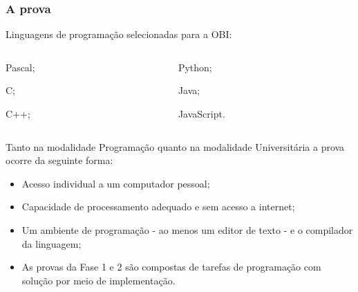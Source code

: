 \begin{frame}
 \frametitle{A prova}
 Linguagens de programação selecionadas para a OBI:
 \begin{itemize}
  \begin{columns}[T]
    \begin{column}[T]{4cm}
      \item Pascal;
      \item C;
      \item C++;
    \end{column}
    \begin{column}[T]{3cm}
      \item Python;
      \item Java;
      \item JavaScript.
    \end{column}
    
   \end{columns}
  \end{itemize}

 Tanto na modalidade Programação quanto na modalidade Universitária
 a prova ocorre da seguinte forma:
 \begin{itemize}
  \item Acesso individual a um computador pessoal;
  \item Capacidade de processamento adequado e sem acesso a internet;
  \item Um ambiente de programação - ao menos um editor de texto - e o compilador da linguagem;
  \item As provas da Fase 1 e 2  são compostas de tarefas de programação com solução por meio de implementação.
 \end{itemize}

\end{frame}
